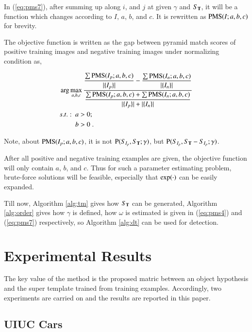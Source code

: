 \documentclass[paper]{ieice}
\begin{document}
In (\ref{eq:pms7}), after summing up along $i$, and $j$ at given $\gamma$ and $S_{\bf T}$, it will be a function which changes according to $I$, $a$, $b$, and $c$. It is rewritten as ${\rm PMS}(I;a,b,c)$ for  brevity.



The objective function is written as the gap between pyramid match scores of positive training images and negative training images under normalizing condition as,

\[\begin{aligned}
&\arg \max\limits_{a,b,c} \dfrac{ \dfrac {\sum {\rm PMS}(I_p;a,b,c)}  {|\{ I_p \}|} - \dfrac {\sum {\rm PMS}(I_n;a,b,c)}  {|\{ I_n \}|} }
{\dfrac
{{\sum {\rm PMS}(I_p;a,b,c)}+ {\sum {\rm PMS}(I_n;a,b,c) }}
{|\{ I_p \}|+|\{ I_n \}|}
}\\
&\begin{aligned}
    s.t.:\mbox{ }& a>0;\\
    &b>0\;.
\end{aligned}
\end{aligned}
\]

Note, about ${\rm PMS}(I_p;a,b,c)$, it is not ${\rm P}(S_{I_p},S_{\bf{T}};\gamma)$, but ${\rm P}(S_{I_p},S_{\bf{T}}-S_{I_p};\gamma)$.

After all positive and negative training examples are given, the objective function will only contain $a$, $b$, and $c$. Thus for such a parameter estimating problem, brute-force solutions will be feasible, especially that $\exp({\bf \cdot})$ can be easily expanded.

Till now, Algorithm \ref{alg:tm} gives how $S_{\bf T}$ can be generated,  Algorithm \ref{alg:order}  gives how $\gamma$ is defined, how $\omega$ is estimated is given in (\ref{eq:pms4}) and (\ref{eq:pms7}) respectively, so Algorithm \ref{alg:dt} can be used for detection.


\section{Experimental Results}
\label{exp5}
The key value of the method is the proposed matric between an object hypothesis and the super template trained from training examples. Accordingly, two experiments are carried on and the results are reported in this paper.


\subsection{UIUC Cars}
\end{document}
